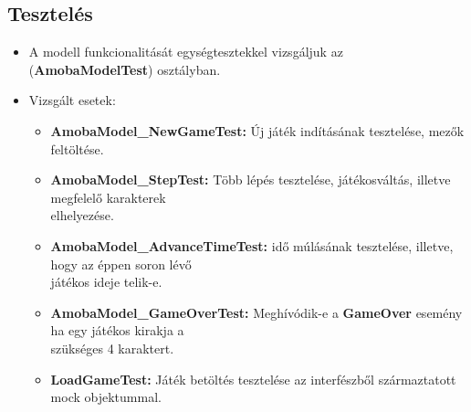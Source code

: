 \documentclass[11pt,a4paper]{article}
\begin{document}
\begin{itemize}
\section{Tesztelés}
	\begin{itemize}
		\item A modell funkcionalitását egységtesztekkel vizsgáljuk az
		(\textbf{AmobaModelTest}) osztályban.
		\item Vizsgált esetek:
		\begin{itemize}
			\item\textbf{AmobaModel\_NewGameTest:} Új játék indításának tesztelése, mezők
			feltöltése.
			\item\textbf{AmobaModel\_StepTest:} Több lépés tesztelése, játékosváltás, illetve
			megfelelő karakterek \\ elhelyezése.
			\item\textbf{AmobaModel\_AdvanceTimeTest:} idő múlásának tesztelése, illetve, hogy
			az éppen soron lévő \\ játékos ideje telik-e.
			\item\textbf{AmobaModel\_GameOverTest:} Meghívódik-e a \textbf{GameOver} esemény
			ha egy játékos kirakja a \\ szükséges 4 karaktert.
			\item\textbf{LoadGameTest:} Játék betöltés tesztelése az interfészből
			származtatott mock objektummal.
		\end{itemize}
	\end{itemize}
\end{itemize}
\end{document}
